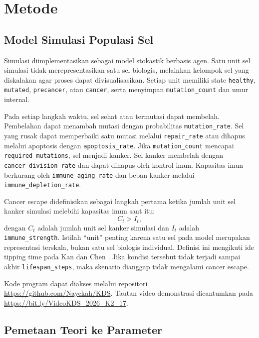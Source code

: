 \section{Metode}

\subsection{Model Simulasi Populasi Sel}

Simulasi diimplementasikan sebagai model stokastik berbasis agen. Satu unit sel
simulasi tidak merepresentasikan satu sel biologis, melainkan kelompok sel yang
diskalakan agar proses dapat divisualisasikan. Setiap unit memiliki state
\texttt{healthy}, \texttt{mutated}, \texttt{precancer}, atau \texttt{cancer},
serta menyimpan \texttt{mutation\_count} dan umur internal.

Pada setiap langkah waktu, sel sehat atau termutasi dapat membelah. Pembelahan
dapat menambah mutasi dengan probabilitas \texttt{mutation\_rate}. Sel yang
rusak dapat memperbaiki satu mutasi melalui \texttt{repair\_rate} atau dihapus
melalui apoptosis dengan \texttt{apoptosis\_rate}. Jika \texttt{mutation\_count}
mencapai \texttt{required\_mutations}, sel menjadi kanker. Sel kanker membelah
dengan \texttt{cancer\_division\_rate} dan dapat dihapus oleh kontrol imun.
Kapasitas imun berkurang oleh \texttt{immune\_aging\_rate} dan beban kanker
melalui \texttt{immune\_depletion\_rate}.




Cancer escape didefinisikan sebagai langkah pertama ketika jumlah unit sel
kanker simulasi melebihi kapasitas imun saat itu:
\begin{equation}
    C_t > I_t,
\end{equation}
dengan $C_t$ adalah jumlah unit sel kanker simulasi dan $I_t$ adalah
\texttt{immune\_strength}. Istilah ``unit'' penting karena satu sel pada model
merupakan representasi terskala, bukan satu sel biologis individual. Definisi
ini mengikuti ide tipping time pada Kan dan Chen \cite{kan2024}. Jika kondisi
tersebut tidak terjadi sampai akhir \texttt{lifespan\_steps}, maka skenario
dianggap tidak mengalami cancer escape.

Kode program dapat diakses melalui repositori
\url{https://github.com/Nayekah/KDS}. Tautan video demonstrasi dicantumkan
pada \url{https://bit.ly/VideoKDS_2026_K2_17}.

\subsection{Pemetaan Teori ke Parameter}

